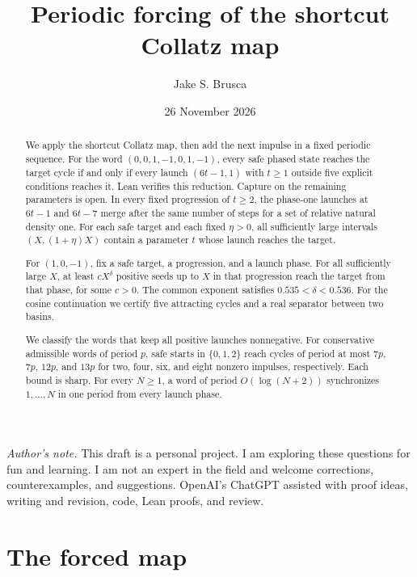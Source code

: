 \documentclass[11pt]{article}
\title{Periodic forcing of the shortcut Collatz map}
\author{Jake S. Brusca}
\date{26 November 2026}
\theoremstyle{definition}
\theoremstyle{remark}
\begin{document}
\maketitle
\begin{abstract}
We apply the shortcut Collatz map, then add the next impulse in a
fixed periodic sequence. For the word $(0,0,1,-1,0,1,-1)$, every safe phased state
reaches the target cycle if and only if every launch $(6t-1,1)$ with
$t\ge1$ outside five explicit conditions reaches it.
Lean verifies this reduction. Capture on the remaining parameters is open.
In every fixed progression of $t\ge2$, the phase-one launches at $6t-1$
and $6t-7$ merge after the same number of steps for a set of relative
natural density one. For each safe target and each fixed $\eta>0$, all sufficiently large
intervals $(X,(1+\eta)X)$ contain a parameter $t$ whose launch reaches
the target.

For $(1,0,-1)$, fix a safe target, a progression, and a launch phase.
For all sufficiently large $X$, at least $cX^\delta$ positive seeds up
to $X$ in that progression reach the target from that phase, for some
$c>0$. The common exponent satisfies $0.535<\delta<0.536$. For the cosine continuation we
certify five attracting cycles and a real separator between two basins.

We classify the words that keep all positive launches nonnegative. For
conservative admissible words of period $p$, safe starts in
$\{0,1,2\}$ reach cycles of period at most $7p$, $7p$, $12p$, and
$13p$ for two, four, six, and eight nonzero impulses, respectively.
Each bound is sharp. For every $N\ge1$, a word of period $O(\log(N+2))$
synchronizes $1,\ldots,N$ in one period from every launch phase.

\end{abstract}

\noindent\textit{Author's note.} This draft is a personal project. I am exploring these
questions for fun and learning. I am not an expert in the field and
welcome corrections, counterexamples, and suggestions.
OpenAI's ChatGPT assisted with proof ideas, writing and revision, code,
Lean proofs, and review.

\tableofcontents
\newpage

\section{The forced map}
\end{document}
